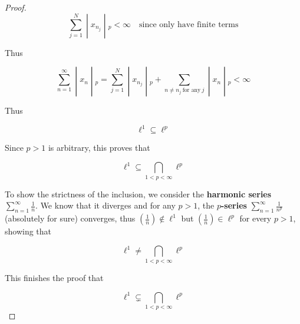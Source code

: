 \documentclass{qlnotes-export}
\begin{document}
\begin{proof}
\[\left. \sum\limits_{j = 1}^{N} \middle| x_{n_{j}} \middle| {}_{p} < \infty\quad\text{since only have finite terms} \right.\]

Thus

\[\left. \sum\limits_{n = 1}^{\infty} \middle| x_{n} \middle| {}_{p} = \sum\limits_{j = 1}^{N} \middle| x_{n_{j}} \middle| {}_{p} + \sum\limits_{n \neq n_{j}\ \text{for any}\ j} \middle| x_{n} \middle| {}_{p} < \infty \right.\]

Thus

\[\ell^{1} \subseteq \ell^{p}\]

Since \(p > 1\) is arbitrary, this proves that

\[\ell^{1} \subseteq \bigcap\limits_{1 < p < \infty}\ell^{p}\]

To show the strictness of the inclusion, we consider the \textbf{harmonic series} \(\sum_{n = 1}^{\infty}\frac{1}{n}\). We know that it diverges and for any \(p > 1\), the \textbf{\(p\)-series} \(\sum_{n = 1}^{\infty}\frac{1}{n^{p}}\) (absolutely for sure) converges, thus \((\frac{1}{n}) \notin \ell^{1}\) but \((\frac{1}{n}) \in \ell^{p}\) for every \(p > 1\), showing that

\[\ell^{1} \neq \bigcap\limits_{1 < p < \infty}\ell^{p}\]

This finishes the proof that

\[\ell^{1} \subsetneq \bigcap\limits_{1 < p < \infty}\ell^{p}\]

\end{proof}
\end{document}

